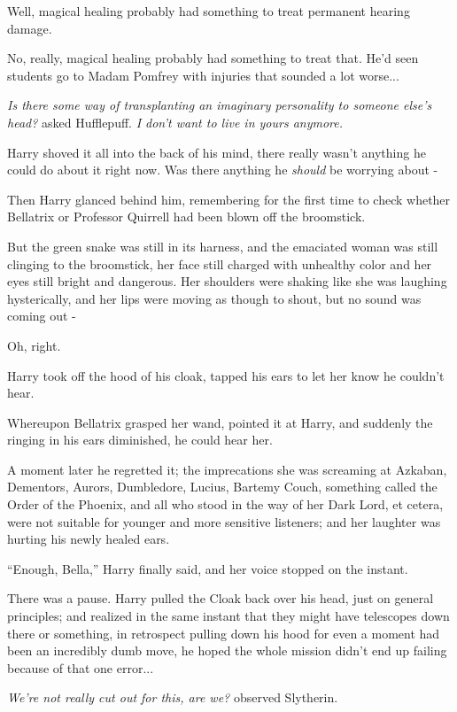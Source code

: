 Well, magical healing probably had something to treat permanent hearing
damage.

No, really, magical healing probably had something to treat that. He'd
seen students go to Madam Pomfrey with injuries that sounded a lot
worse...

\emph{Is there some way of transplanting an imaginary personality to
someone else's head?} asked Hufflepuff. \emph{I don't want to live in
yours anymore.}

Harry shoved it all into the back of his mind, there really wasn't
anything he could do about it right now. Was there anything he
\emph{should} be worrying about -

Then Harry glanced behind him, remembering for the first time to check
whether Bellatrix or Professor Quirrell had been blown off the
broomstick.

But the green snake was still in its harness, and the emaciated woman
was still clinging to the broomstick, her face still charged with
unhealthy color and her eyes still bright and dangerous. Her shoulders
were shaking like she was laughing hysterically, and her lips were
moving as though to shout, but no sound was coming out -

Oh, right.

Harry took off the hood of his cloak, tapped his ears to let her know he
couldn't hear.

Whereupon Bellatrix grasped her wand, pointed it at Harry, and suddenly
the ringing in his ears diminished, he could hear her.

A moment later he regretted it; the imprecations she was screaming at
Azkaban, Dementors, Aurors, Dumbledore, Lucius, Bartemy Couch, something
called the Order of the Phoenix, and all who stood in the way of her
Dark Lord, et cetera, were not suitable for younger and more sensitive
listeners; and her laughter was hurting his newly healed ears.

``Enough, Bella,'' Harry finally said, and her voice stopped on the
instant.

There was a pause. Harry pulled the Cloak back over his head, just on
general principles; and realized in the same instant that they might
have telescopes down there or something, in retrospect pulling down his
hood for even a moment had been an incredibly dumb move, he hoped the
whole mission didn't end up failing because of that one error...

\emph{We're not really cut out for this, are we?} observed Slytherin.

